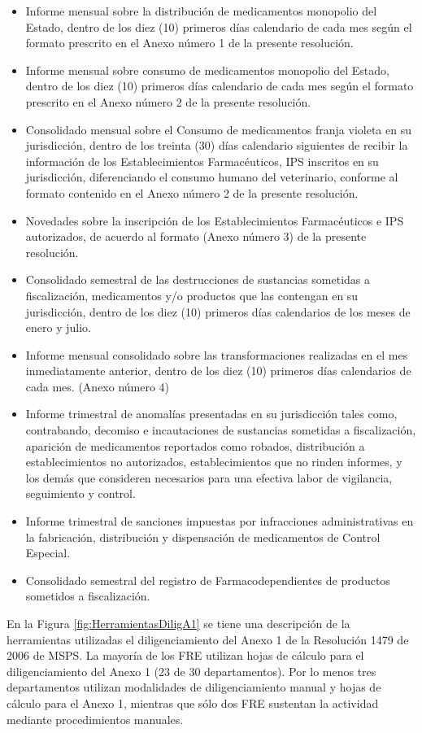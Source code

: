 \documentclass[
]{book}
\begin{document}
\begin{itemize}
\item
  Informe mensual sobre la distribución de medicamentos monopolio del Estado, dentro de los diez (10) primeros días calendario de cada mes según el formato prescrito en el Anexo número 1 de la presente resolución.
\item
  Informe mensual sobre consumo de medicamentos monopolio del Estado, dentro de los diez (10) primeros días calendario de cada mes según el formato prescrito en el Anexo número 2 de la presente resolución.
\item
  Consolidado mensual sobre el Consumo de medicamentos franja violeta en su jurisdicción, dentro de los treinta (30) días calendario siguientes de recibir la información de los Establecimientos Farmacéuticos, IPS inscritos en su jurisdicción, diferenciando el consumo humano del veterinario, conforme al formato contenido en el Anexo número 2 de la presente resolución.
\item
  Novedades sobre la inscripción de los Establecimientos Farmacéuticos e IPS autorizados, de acuerdo al formato (Anexo número 3) de la presente resolución.
\item
  Consolidado semestral de las destrucciones de sustancias sometidas a fiscalización, medicamentos y/o productos que las contengan en su jurisdicción, dentro de los diez (10) primeros días calendarios de los meses de enero y julio.
\item
  Informe mensual consolidado sobre las transformaciones realizadas en el mes inmediatamente anterior, dentro de los diez (10) primeros días calendarios de cada mes. (Anexo número 4)
\item
  Informe trimestral de anomalías presentadas en su jurisdicción tales como, contrabando, decomiso e incautaciones de sustancias sometidas a fiscalización, aparición de medicamentos reportados como robados, distribución a establecimientos no autorizados, establecimientos que no rinden informes, y los demás que consideren necesarios para una efectiva labor de vigilancia, seguimiento y control.
\item
  Informe trimestral de sanciones impuestas por infracciones administrativas en la fabricación, distribución y dispensación de medicamentos de Control Especial.
\item
  Consolidado semestral del registro de Farmacodependientes de productos sometidos a fiscalización.
\end{itemize}

En la Figura \ref{fig:HerramientasDiligA1} se tiene una descripción de la herramientas utilizadas el diligenciamiento del Anexo 1 de la Resolución 1479 de 2006 de MSPS. La mayoría de los FRE utilizan hojas de cálculo para el diligenciamiento del Anexo 1 (23 de 30 departamentos). Por lo menos tres departamentos utilizan modalidades de diligenciamiento manual y hojas de cálculo para el Anexo 1, mientras que sólo dos FRE sustentan la actividad mediante procedimientos manuales.
\end{document}
